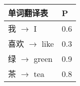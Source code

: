 

{\small
\begin{tabular}{l | l}
单词翻译表 & P \\ \hline
我 $\to$ I & 0.6 \\
喜欢 $\to$ like & 0.3 \\
绿 $\to$ green & 0.9 \\
茶 $\to$ tea & 0.8 \\
\end{tabular}
}

